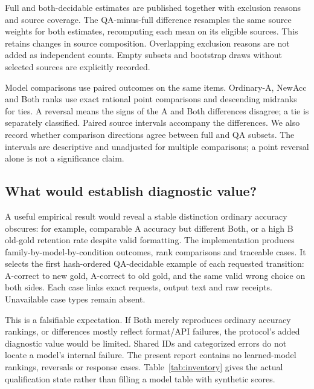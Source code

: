 \documentclass[10pt,twocolumn,letterpaper]{article}
\begin{document}
Full and both-decidable estimates are published together with exclusion
reasons and source coverage. The QA-minus-full difference resamples
the same source weights for both estimates, recomputing each mean
on its eligible sources. This retains changes in source composition.
Overlapping exclusion reasons are not added as independent counts.
Empty subsets and bootstrap draws without selected sources are
explicitly recorded.

Model comparisons use paired outcomes on the same items. Ordinary-A,
NewAcc and Both ranks use exact rational point comparisons and
descending midranks for ties. A reversal means the signs of the A
and Both differences disagree; a tie is separately classified.
Paired source intervals accompany the differences. We also record
whether comparison directions agree between full and QA subsets.
The intervals are descriptive and unadjusted for multiple comparisons;
a point reversal alone is not a significance claim.

\subsection{What would establish diagnostic value?}
A useful empirical result would reveal a stable distinction ordinary
accuracy obscures: for example, comparable A accuracy but different
Both, or a high B old-gold retention rate despite valid formatting.
The implementation produces family-by-model-by-condition outcomes,
rank comparisons and traceable cases. It selects the first hash-ordered
QA-decidable example of each requested transition: A-correct to new
gold, A-correct to old gold, and the same valid wrong choice on both
sides. Each case links exact requests, output text and raw receipts.
Unavailable case types remain absent.

This is a falsifiable expectation. If Both merely reproduces ordinary
accuracy rankings, or differences mostly reflect format/API failures,
the protocol's added diagnostic value would be limited. Shared IDs
and categorized errors do not locate a model's internal failure.
The present report contains no learned-model rankings, reversals or
response cases. Table~\ref{tab:inventory} gives the actual qualification
state rather than filling a model table with synthetic scores.

\begin{table}[t]
\centering\small
\caption{Current primary visual inventory. QA final counts completed
human decisions, not rendered images. No completed model runs are
registered. Both-decidable coverage is 0/140 pairs; this is an
evidence-availability count, not model accuracy.}
\label{tab:inventory}

\end{table}
\end{document}
